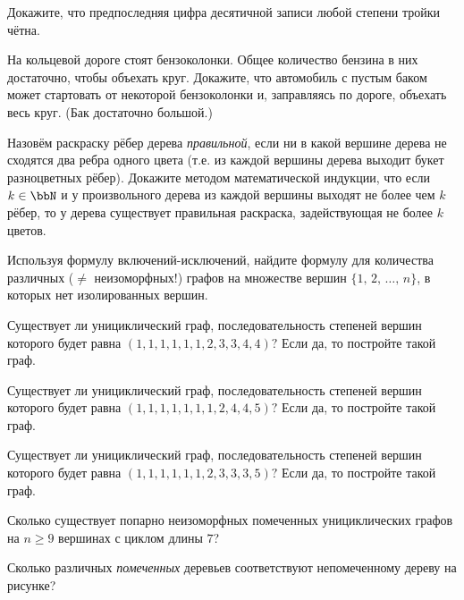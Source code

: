 Докажите, что предпоследняя цифра десятичной записи любой степени тройки чётна.


На кольцевой дороге стоят бензоколонки. Общее количество бензина в них достаточно, чтобы объехать круг. Докажите, что автомобиль с пустым баком может стартовать от некоторой бензоколонки и, заправляясь по дороге, объехать весь круг. (Бак достаточно большой.)


Назовём раскраску рёбер дерева \emph{правильной}, если ни в какой вершине дерева не сходятся два ребра одного цвета (т.е. из каждой вершины дерева выходит букет разноцветных рёбер). Докажите методом математической индукции, что если $k\in\bbN$ и у произвольного дерева из каждой вершины выходят не более чем $k$ рёбер, то у дерева существует правильная раскраска, задействующая не более $k$ цветов.


Используя формулу включений-исключений, найдите формулу для количества различных ($\neq$ неизоморфных!) графов на множестве вершин $\{1,\,2,\,\ldots,\,n\}$, в которых нет изолированных вершин.

Существует ли унициклический граф, последовательность степеней вершин которого будет равна  $(1,1,1,1,1,1,2,3,3,4,4)?$ Если да, то постройте такой граф.

Существует ли унициклический граф, последовательность степеней вершин которого будет равна
$(1,1,1,1,1,1,1,2,4,4,5)?$ Если да, то постройте такой граф.

Существует ли унициклический граф, последовательность степеней вершин которого будет равна
$(1,1,1,1,1,1,2,3,3,3,5)?$ Если да, то постройте такой граф.

Сколько существует попарно неизоморфных помеченных унициклических графов на $n\ge 9$ вершинах с циклом длины $7$?

Сколько различных \emph{помеченных} деревьев соответствуют непомеченному дереву на рисунке?
\begin{center}
\end{center}

